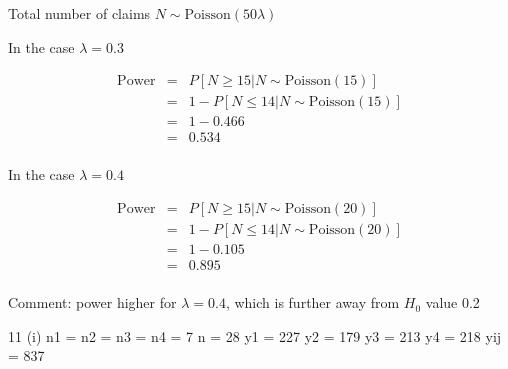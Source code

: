 \documentclass[a4paper,12pt]{article}
\begin{document}

Total number of claims $N \sim \mbox{Poisson}(50 \lambda)$

In the case $\lambda = 0.3$

\begin{eqnarray*}
\mbox{Power} 
&=& P[N \geq 15| N \sim \mbox{Poisson}(15)]\\
&=& 1 -  P[N \leq 14|  N \sim \mbox{Poisson}(15)]\\
&=& 1 - 0.466\\
&=& 0.534 \\
\end{eqnarray*}

In the case $\lambda = 0.4$

\begin{eqnarray*}
\mbox{Power} 
&=& P[N \geq 15| N \sim \mbox{Poisson}(20)]\\
&=& 1 -  P[N \leq 14|  N \sim \mbox{Poisson}(20)]\\
&=& 1 - 0.105  \\
&=& 0.895 \\
\end{eqnarray*}

Comment: power higher for
$\lambda = 0.4$, which is further away from $H_0$ value 0.2

11 (i) n1 = n2 = n3 = n4 = 7 n = 28
y1 = 227 y2 = 179 y3 = 213 y4 = 218 yij = 837
\end{document}
